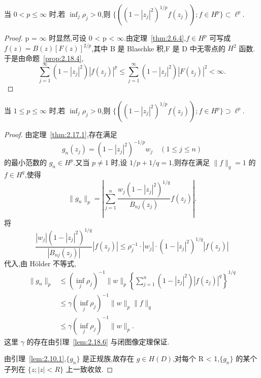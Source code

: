 \begin{lemma}\label{lem:2.18.6}
当 $0 < p \leq \infty$ 时,若 $\inf_{j}\rho_{j} > 0$,则 $\{((1 - |z_{j}|^{2})^{1/p}f(z_{j})); f \in H^{p}\} \subset \ell^{p}$.
\end{lemma}

\begin{proof}
p = $\infty$ 时显然,可设 0 < p < $\infty$.由定理~\ref{thm:2.6.4},$f \in H^{p}$ 可写成 $f(z) = B(z)[F(z)]^{2/p}$,其中 B 是 Blaschke 积,F 是 D 中无零点的 $H^{2}$ 函数.于是由命题~\ref{prop:2.18.4},
\begin{equation*}
\sum_{j=1}^{\infty}(1 - |z_{j}|^{2})|f(z_{j})|^{p} \leq \sum_{j=1}^{\infty}(1 - |z_{j}|^{2})|F(z_{j})|^{2} < \infty.
\end{equation*}
\end{proof}

\begin{lemma}\label{lem:2.18.7}
当 $1 \leq p \leq \infty$ 时,若 $\inf_{j}\rho_{j} > 0$,则 $\{((1 - |z_{j}|^{2})^{1/p}f(z_{j})); f \in H^{p}\} \supset \ell^{p}$.
\end{lemma}

\begin{proof}
由定理~\ref{thm:2.17.1},存在满足
\begin{equation*}
g_{n}(z_{j}) = (1 - |z_{j}|^{2})^{-1/p}w_{j} \quad (1 \leq j \leq n)
\end{equation*}
的最小范数的 $g_{n} \in H^{p}$.又当 $p \neq 1$ 时,设 $1/p + 1/q = 1$,则存在满足 $\|f\|_{q} = 1$ 的 $f \in H^{q}$,使得
\begin{equation*}
\|g_{n}\|_{p} = \left| \sum_{j=1}^{n} \frac{w_{j}(1 - |z_{j}|^{2})^{1/q}}{B_{nj}(z_{j})} f(z_{j}) \right|.
\end{equation*}
将
\begin{equation*}
\frac{|w_{j}|(1 - |z_{j}|^{2})^{1/q}}{|B_{nj}(z_{j})|}|f(z_{j})| \leq \rho_{j}^{-1}\cdot|w_{j}|\cdot(1 - |z_{j}|^{2})^{1/q}|f(z_{j})|
\end{equation*}
代入,由 Hölder 不等式,
\begin{align*}
\|g_{n}\|_{p} &\leq (\inf_{j}\rho_{j})^{-1}\|w\|_{p}\left\{\sum_{j=1}^{n}(1 - |z_{j}|^{2})|f(z_{j})|^{q}\right\}^{1/q} \\
&\leq \gamma(\inf_{j}\rho_{j})^{-1}\|w\|_{p}\|f\|_{q} \\
&\leq \gamma(\inf_{j}\rho_{j})^{-1}\|w\|_{p}.
\end{align*}
这里 $\gamma$ 的存在由引理~\ref{lem:2.18.6} 与闭图像定理保证.

由引理~\ref{lem:2.10.1},$\{g_{n}\}$ 是正规族,故存在 $g \in H(D)$,对每个 R < 1,$\{g_{n}\}$ 的某个子列在 $\{z; |z| < R\}$ 上一致收敛.
\end{proof}

